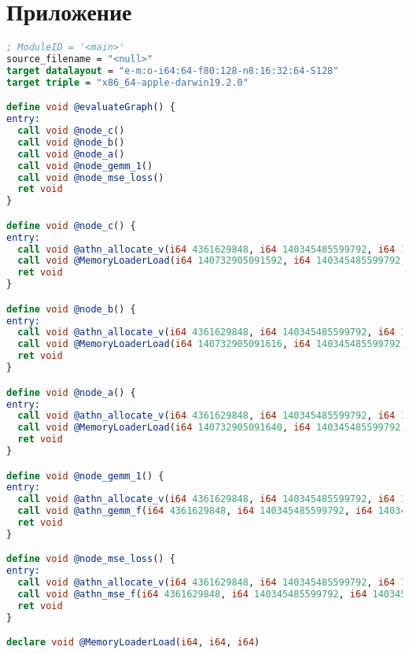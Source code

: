 \clearpage
\begingroup
{}
{}
\section*{Приложение}





\begin{lstlisting}[language=llvm,caption=Пример LLVM IR]
; ModuleID = '<main>'
source_filename = "<null>"
target datalayout = "e-m:o-i64:64-f80:128-n8:16:32:64-S128"
target triple = "x86_64-apple-darwin19.2.0"

define void @evaluateGraph() {
entry:
  call void @node_c()
  call void @node_b()
  call void @node_a()
  call void @node_gemm_1()
  call void @node_mse_loss()
  ret void
}

define void @node_c() {
entry:
  call void @athn_allocate_v(i64 4361629848, i64 140345485599792, i64 140345485619416)
  call void @MemoryLoaderLoad(i64 140732905091592, i64 140345485599792, i64 140345485619416)
  ret void
}

define void @node_b() {
entry:
  call void @athn_allocate_v(i64 4361629848, i64 140345485599792, i64 140345485616152)
  call void @MemoryLoaderLoad(i64 140732905091616, i64 140345485599792, i64 140345485616152)
  ret void
}

define void @node_a() {
entry:
  call void @athn_allocate_v(i64 4361629848, i64 140345485599792, i64 140345485613576)
  call void @MemoryLoaderLoad(i64 140732905091640, i64 140345485599792, i64 140345485613576)
  ret void
}

define void @node_gemm_1() {
entry:
  call void @athn_allocate_v(i64 4361629848, i64 140345485599792, i64 140345485611632)
  call void @athn_gemm_f(i64 4361629848, i64 140345485599792, i64 140345485619376, i64 140345485613576, i64 140345485616152, i64 140345485611632)
  ret void
}

define void @node_mse_loss() {
entry:
  call void @athn_allocate_v(i64 4361629848, i64 140345485599792, i64 140345485620352)
  call void @athn_mse_f(i64 4361629848, i64 140345485599792, i64 140345485611632, i64 140345485619416, i64 140345485620352)
  ret void
}

declare void @MemoryLoaderLoad(i64, i64, i64)


\end{lstlisting}
